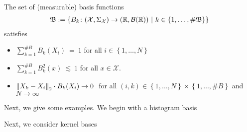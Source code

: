 \begin{assumption}
  The set of (measurable) basis functions 
\begin{gather*}
  \mathfrak{B}
  :
  =
  \left\{ 
B_k\colon (\mathcal{X},\Sigma_\mathcal{X})\to(\R,\mathcal{B}(\R))
\ 
|
\ 
k\in \left\{ 1,\ldots,\# \mathfrak{B} \right\}
  \right\}
\end{gather*}
  satisfies
  \begin{itemize}
    \item
      $
      \sum_{k=1}^{\# B} 
      B_k(X_i)
      \ 
      =
      \ 
      1
      $
      for all 
      $i\in \left\{ 1,\ldots ,N \right\}$
    \item
      $
      \sum_{k=1}^{\# B} 
      B_k^2(x)
      \ 
      \lesssim
      \ 
      1
      $
      for all $x\in\mathcal{X}$.
    \item
      $
      \left\lVert X_k - X_i\right\rVert_2
      \cdot
      B_k(X_i)
      \to
      0
      \ 
      $
      for all 
      $
      (i,k)
      \in
      \left\{ 1,\ldots, N \right\}
      \times
      \left\{ 1,\ldots,\# B \right\}
      $
      and
      $N\to\infty$
  \end{itemize}
\end{assumption}
Next, we give some examples. 
We begin with a histogram basis \cite[§4]{Gyorfi2002}
\begin{example}

\end{example}

Next, we consider kernel bases \cite[§5]{Gyorfi2002}
\begin{example}

\end{example}
